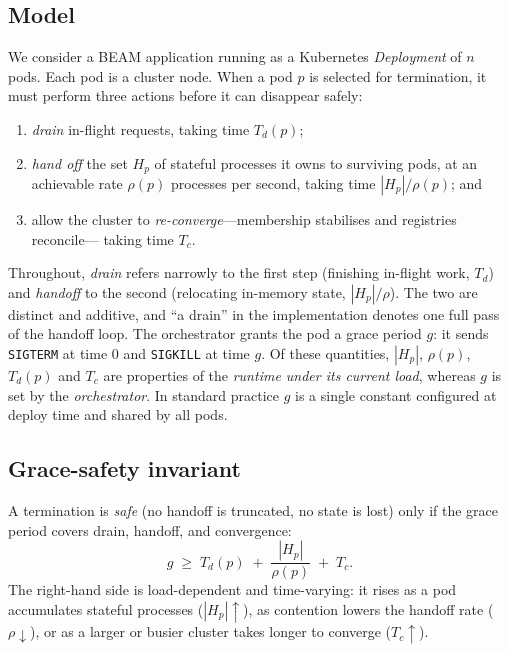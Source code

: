 \documentclass[AMA,Times1COL]{WileyNJDv5}
\begin{document}
\subsection{Model}\label{sec:model-model}
We consider a BEAM application running as a Kubernetes \emph{Deployment} of $n$ pods. Each pod is a
cluster node. When a pod $p$ is selected for termination, it must perform three actions before it can
disappear safely:
\begin{enumerate}
  \item \emph{drain} in-flight requests, taking time $T_d(p)$;
  \item \emph{hand off} the set $H_p$ of stateful processes it owns to surviving pods, at an
        achievable rate $\rho(p)$ processes per second, taking time $|H_p|/\rho(p)$; and
  \item allow the cluster to \emph{re-converge}---membership stabilises and registries reconcile---
        taking time $T_c$.
\end{enumerate}
Throughout, \emph{drain} refers narrowly to the first step (finishing in-flight work, $T_d$) and
\emph{handoff} to the second (relocating in-memory state, $|H_p|/\rho$). The two are distinct and
additive, and ``a drain'' in the implementation denotes one full pass of the handoff loop.
The orchestrator grants the pod a grace period $g$: it sends \texttt{SIGTERM} at time $0$ and
\texttt{SIGKILL} at time $g$. Of these quantities, $|H_p|$, $\rho(p)$, $T_d(p)$ and $T_c$ are
properties of the \emph{runtime under its current load}, whereas $g$ is set by the \emph{orchestrator}.
In standard practice $g$ is a single constant configured at deploy time and shared by all pods.

\subsection{Grace-safety invariant}\label{sec:model-invariant}
A termination is \emph{safe} (no handoff is truncated, no state is lost) only if the grace period
covers drain, handoff, and convergence:
\begin{equation}\label{eq:invariant}
  g \;\ge\; T_d(p) \;+\; \frac{|H_p|}{\rho(p)} \;+\; T_c .
\end{equation}
The right-hand side is load-dependent and time-varying: it rises as a pod accumulates stateful
processes ($|H_p|\!\uparrow$), as contention lowers the handoff rate ($\rho\!\downarrow$), or as a
larger or busier cluster takes longer to converge ($T_c\!\uparrow$).
\end{document}
